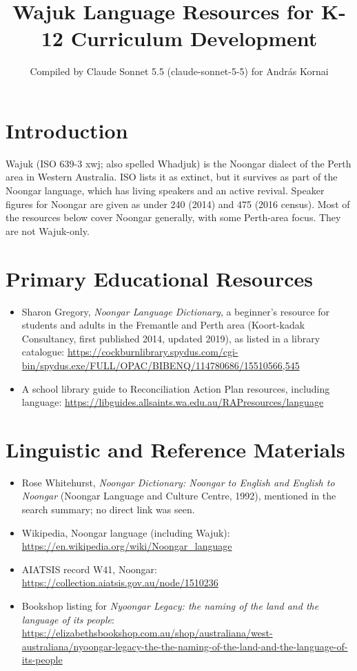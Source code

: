 \documentclass[12pt]{article}
\title{Wajuk Language Resources for K-12 Curriculum Development}
\author{Compiled by Claude Sonnet 5.5 (claude-sonnet-5-5) for Andr\'as Kornai}
\date{}
\begin{document}
\maketitle

\section{Introduction}
Wajuk (ISO 639-3 xwj; also spelled Whadjuk) is the Noongar dialect of the Perth area in Western Australia. ISO lists it as extinct, but it survives as part of the Noongar language, which has living speakers and an active revival. Speaker figures for Noongar are given as under 240 (2014) and 475 (2016 census). Most of the resources below cover Noongar generally, with some Perth-area focus. They are not Wajuk-only.

\section{Primary Educational Resources}
\begin{itemize}
\item Sharon Gregory, \emph{Noongar Language Dictionary}, a beginner's resource for students and adults in the Fremantle and Perth area (Koort-kadak Consultancy, first published 2014, updated 2019), as listed in a library catalogue: \url{https://cockburnlibrary.spydus.com/cgi-bin/spydus.exe/FULL/OPAC/BIBENQ/114780686/15510566,545}
\item A school library guide to Reconciliation Action Plan resources, including language: \url{https://libguides.allsaints.wa.edu.au/RAPresources/language}
\end{itemize}

\section{Linguistic and Reference Materials}
\begin{itemize}
\item Rose Whitehurst, \emph{Noongar Dictionary: Noongar to English and English to Noongar} (Noongar Language and Culture Centre, 1992), mentioned in the search summary; no direct link was seen.
\item Wikipedia, Noongar language (including Wajuk): \url{https://en.wikipedia.org/wiki/Noongar_language}
\item AIATSIS record W41, Noongar: \url{https://collection.aiatsis.gov.au/node/1510236}
\item Bookshop listing for \emph{Nyoongar Legacy: the naming of the land and the language of its people}: \url{https://elizabethsbookshop.com.au/shop/australiana/west-australiana/nyoongar-legacy-the-the-naming-of-the-land-and-the-language-of-its-people}
\end{itemize}
\end{document}
